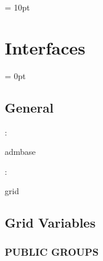 \documentclass{article}
\begin{document}
\vspace{0.5cm}\parskip = 10pt 

\section{Interfaces} 


\parskip = 0pt

\vspace{3mm} \subsection*{General}

: 

admbase
\vspace{2mm}

: 

grid
\vspace{2mm}
\subsection*{Grid Variables}
\vspace{5mm}\subsubsection{PUBLIC GROUPS}

\vspace{5mm}
\end{document}
